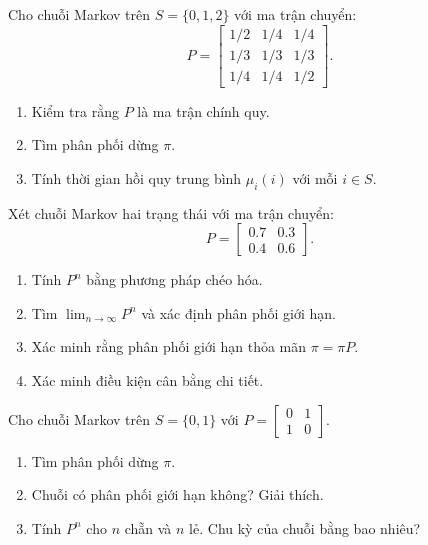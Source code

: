 \begin{exercise}
\label{ex:ch7-1}
Cho chuỗi Markov trên $S = \{0, 1, 2\}$ với ma trận chuyển:
\[
  P = \begin{bmatrix}
    1/2 & 1/4 & 1/4 \\
    1/3 & 1/3 & 1/3 \\
    1/4 & 1/4 & 1/2
  \end{bmatrix}.
\]
\begin{enumerate}[label=(\alph*)]
  \item Kiểm tra rằng $P$ là ma trận chính quy.
  \item Tìm phân phối dừng $\pi$.
  \item Tính thời gian hồi quy trung bình $\mu_i(i)$ với mỗi $i \in S$.
\end{enumerate}
\end{exercise}

\begin{exercise}
\label{ex:ch7-2}
Xét chuỗi Markov hai trạng thái với ma trận chuyển:
\[
  P = \begin{bmatrix} 0.7 & 0.3 \\ 0.4 & 0.6 \end{bmatrix}.
\]
\begin{enumerate}[label=(\alph*)]
  \item Tính $P^n$ bằng phương pháp chéo hóa.
  \item Tìm $\lim_{n\to\infty} P^n$ và xác định phân phối giới hạn.
  \item Xác minh rằng phân phối giới hạn thỏa mãn $\pi = \pi P$.
  \item Xác minh điều kiện cân bằng chi tiết.
\end{enumerate}
\end{exercise}

\begin{exercise}
\label{ex:ch7-3}
Cho chuỗi Markov trên $S = \{0, 1\}$ với $P = \begin{bmatrix} 0 & 1 \\ 1 & 0 \end{bmatrix}$.
\begin{enumerate}[label=(\alph*)]
  \item Tìm phân phối dừng $\pi$.
  \item Chuỗi có phân phối giới hạn không? Giải thích.
  \item Tính $P^n$ cho $n$ chẵn và $n$ lẻ. Chu kỳ của chuỗi bằng bao nhiêu?
\end{enumerate}
\end{exercise}

